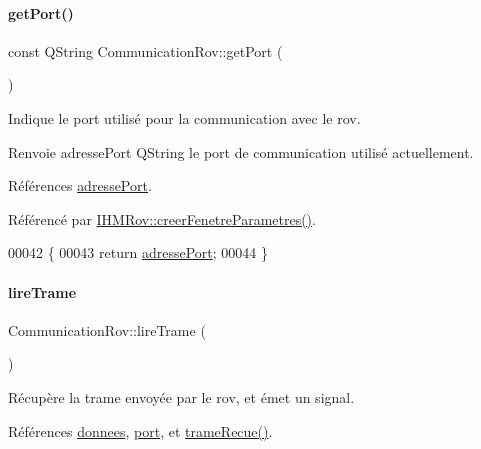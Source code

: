 \paragraph{\texorpdfstring{get\+Port()}{getPort()}}
{\footnotesize\ttfamily const Q\+String Communication\+Rov\+::get\+Port (\begin{DoxyParamCaption}{ }\end{DoxyParamCaption})}

Indique le port utilisé pour la communication avec le rov.

\begin{DoxyReturn}{Renvoie}
adresse\+Port Q\+String le port de communication utilisé actuellement. 
\end{DoxyReturn}


Références \hyperlink{class_communication_rov_a7bd5d36d065005b27ed6cb421c7ffe42}{adresse\+Port}.



Référencé par \hyperlink{class_i_h_m_rov_aed451139ac09ef18b7c92637761d80ce}{I\+H\+M\+Rov\+::creer\+Fenetre\+Parametres()}.


\begin{DoxyCode}
00042 \{
00043     \textcolor{keywordflow}{return} \hyperlink{class_communication_rov_a7bd5d36d065005b27ed6cb421c7ffe42}{adressePort};
00044 \}
\end{DoxyCode}
\mbox{\label{class_communication_rov_a5822d2f41553221ea876ea09e148f859}} 
\paragraph{\texorpdfstring{lire\+Trame}{lireTrame}}
{\footnotesize\ttfamily Communication\+Rov\+::lire\+Trame (\begin{DoxyParamCaption}{ }\end{DoxyParamCaption})\hspace{0.3cm}{\ttfamily [slot]}}

Récupère la trame envoyée par le rov, et émet un signal. 

Références \hyperlink{class_communication_rov_acbb6939bb597179956c6f4bc5ca39f3f}{donnees}, \hyperlink{class_communication_rov_a21b62067ef0b2a6aec339df60b4abd72}{port}, et \hyperlink{class_communication_rov_add205822378629204a4ee49ca74c6d56}{trame\+Recue()}.




